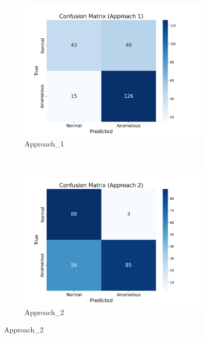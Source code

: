 \documentclass[12pt,DIV14,BCOR12mm,a4paper,footinclude=false,headinclude,parskip=half-,twoside,openright,cleardoublepage=empty,toc=index,bibliography=totoc,listof=totoc]{scrreprt}
\numberwithin{equation}{chapter}
\begin{document}
\begin{figure}
    \centering
    \begin{subfigure}[b]{0.55\textwidth} %
        \centering
        \includegraphics[width=\textwidth]{../media/confusion_matrix_approach_1.png}
        \caption{Approach\_1}
        \label{fig:confusion1}
    \end{subfigure}
    \\ %
    \begin{subfigure}[b]{0.55\textwidth} %
        \centering
        \includegraphics[width=\textwidth]{../media/confusion_matrix_approach_2.png}
        \caption{Approach\_2}
        \label{fig:confusion2}

\end{subfigure}
\end{figure}
\end{document}
